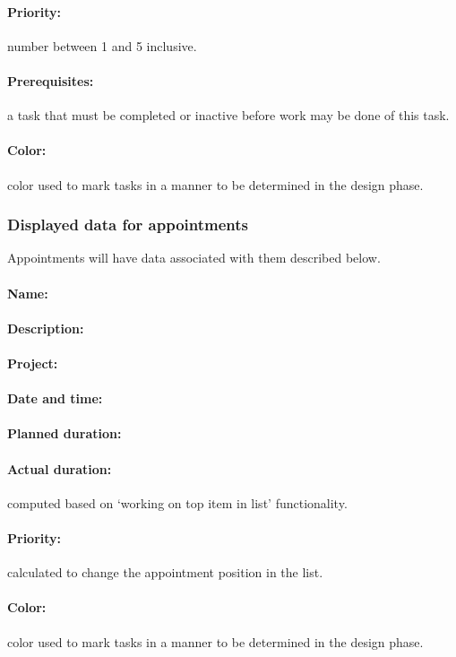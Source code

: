 \documentclass[12pt,a4paper]{article}
\begin{document}
\paragraph{Priority:} number between 1 and 5 inclusive.
\paragraph{Prerequisites:} a task that must be completed or inactive before work may be done of this task.
\paragraph{Color:} color used to mark tasks in a manner to be determined in the design phase.


\subsubsection{Displayed data for appointments}
Appointments will have data associated with them described below.
\paragraph{Name:}
\paragraph{Description:}
\paragraph{Project:}
\paragraph{Date and time:}
\paragraph{Planned duration:}
\paragraph{Actual duration:} computed based on `working on top item in list' functionality.
\paragraph{Priority:} calculated to change the appointment position in the list.
\paragraph{Color:} color used to mark tasks in a manner to be determined in the design phase.
\end{document}
